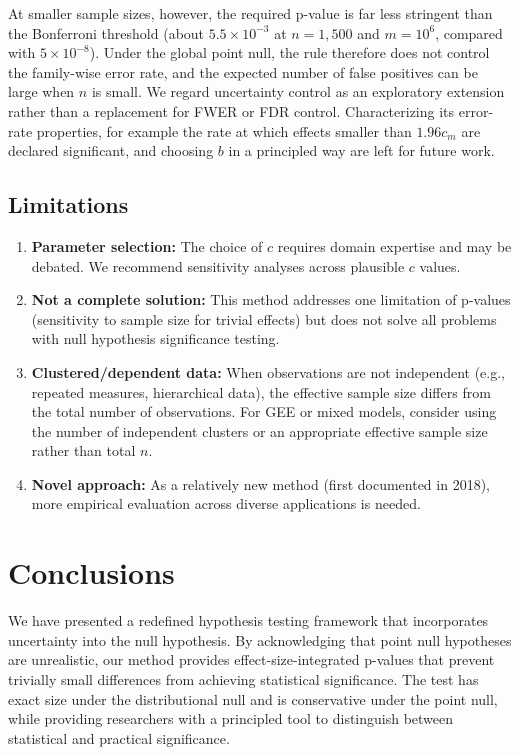 \documentclass[
  11pt,
  letterpaper,
]{article}
\begin{document}
At smaller sample sizes, however, the required p-value is far less
stringent than the Bonferroni threshold (about \(5.5 \times 10^{-3}\) at
\(n = 1{,}500\) and \(m = 10^6\), compared with \(5 \times 10^{-8}\)).
Under the global point null, the rule therefore does not control the
family-wise error rate, and the expected number of false positives can
be large when \(n\) is small. We regard uncertainty control as an
exploratory extension rather than a replacement for FWER or FDR control.
Characterizing its error-rate properties, for example the rate at which
effects smaller than \(1.96c_m\) are declared significant, and choosing
\(b\) in a principled way are left for future work.

\subsection{Limitations}\label{limitations}

\begin{enumerate}
\def\labelenumi{\arabic{enumi}.}
\item
  \textbf{Parameter selection:} The choice of \(c\) requires domain
  expertise and may be debated. We recommend sensitivity analyses across
  plausible \(c\) values.
\item
  \textbf{Not a complete solution:} This method addresses one limitation
  of p-values (sensitivity to sample size for trivial effects) but does
  not solve all problems with null hypothesis significance testing.
\item
  \textbf{Clustered/dependent data:} When observations are not
  independent (e.g., repeated measures, hierarchical data), the
  effective sample size differs from the total number of observations.
  For GEE or mixed models, consider using the number of independent
  clusters or an appropriate effective sample size rather than total
  \(n\).
\item
  \textbf{Novel approach:} As a relatively new method (first documented
  in 2018), more empirical evaluation across diverse applications is
  needed.
\end{enumerate}

\section{Conclusions}\label{sec-conclusion}

We have presented a redefined hypothesis testing framework that
incorporates uncertainty into the null hypothesis. By acknowledging that
point null hypotheses are unrealistic, our method provides
effect-size-integrated p-values that prevent trivially small differences
from achieving statistical significance. The test has exact size under
the distributional null and is conservative under the point null, while
providing researchers with a principled tool to distinguish between
statistical and practical significance.
\end{document}
